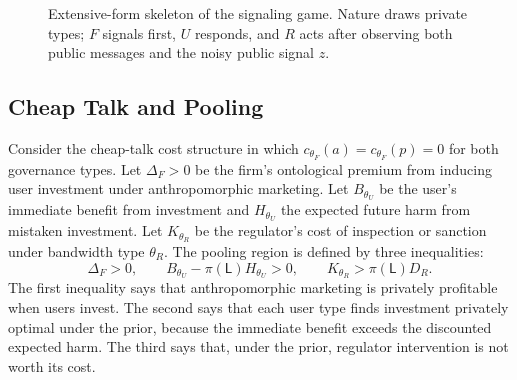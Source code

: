 \begin{figure}[t]
\centering
{}
\caption{Extensive-form skeleton of the signaling game. Nature draws private
types; $F$ signals first, $U$ responds, and $R$ acts after observing both public
messages and the noisy public signal $z$.}
\label{fig:signaling-tree}
\end{figure}

\subsection{Cheap Talk and Pooling}
\label{subsec:cheap-talk-pooling}

Consider the cheap-talk cost structure in which $c_{\theta_F}(a)=c_{\theta_F}(p)=0$
for both governance types. Let $\Delta_F>0$ be the firm's ontological premium
from inducing user investment under anthropomorphic marketing. Let $B_{\theta_U}$
be the user's immediate benefit from investment and $H_{\theta_U}$ the expected
future harm from mistaken investment. Let $K_{\theta_R}$ be the regulator's cost
of inspection or sanction under bandwidth type $\theta_R$. The pooling region is
defined by three inequalities:
\[
\Delta_F>0,\qquad
B_{\theta_U}-\pi(\mathsf{L})H_{\theta_U}>0,\qquad
K_{\theta_R}>\pi(\mathsf{L})D_R .
\]
The first inequality says that anthropomorphic marketing is privately profitable
when users invest. The second says that each user type finds investment
privately optimal under the prior, because the immediate benefit exceeds the
discounted expected harm. The third says that, under the prior, regulator
intervention is not worth its cost.

